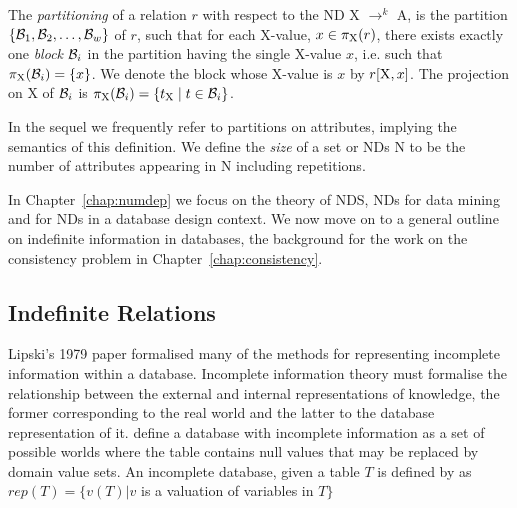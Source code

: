 \begin{definition}\label{def:nd_part}
\begin{rm}
The {\em partitioning} of a relation $r$ with respect to the ND 
X $\to^k$ A, is the partition $\{{\cal B}_1, {\cal B}_2, \ldots, {\cal B}_w\}$
of $r$, such that for each X-value, $x \in \pi_{\rm X}(r)$, 
there exists exactly one {\em block} ${\cal B}_i$ in the partition 
having the single X-value $x$, i.e. such that $\pi_{\rm X}({\cal B}_i) = \{x\}$.
We denote the block whose X-value is $x$ by $r[{\rm X}, x]$.
The projection on X of ${\cal B}_i$ is $\pi_{\rm X}({\cal B}_i) = \{
t_{\rm X} \mid t \in {\cal B}_i \}$. 
\end{rm}
\end{definition}

In the sequel we frequently refer to partitions on attributes,
implying the semantics of this definition.
We define the {\em size} of a set or NDs N to be the number of attributes 
appearing in N including repetitions.

\medskip

In Chapter~\ref{chap:numdep} we focus on the theory of NDS, NDs for
data mining and for NDs in a database design context. We now move on
to a general outline on indefinite information in databases, the
background for the work on the consistency problem in Chapter~\ref{chap:consistency}.

\subsection{Indefinite Relations}\label{subsec:rev_indef}


Lipski's 1979 paper \cite{lip79} formalised many of the methods for 
representing incomplete information within a database.  Incomplete
information theory must formalise the relationship between the external
and internal representations of knowledge, the former corresponding to
the real world and the latter to the database representation of it.
\cite{databasefound} define a database with incomplete information as a set
of possible worlds where the table contains null values that may be replaced
by domain value sets. An incomplete database, given a table $T$ is
defined by \cite{databasefound}
as $rep(T) = \{v(T) |  v$  is a valuation of variables in  $T \}$\\


